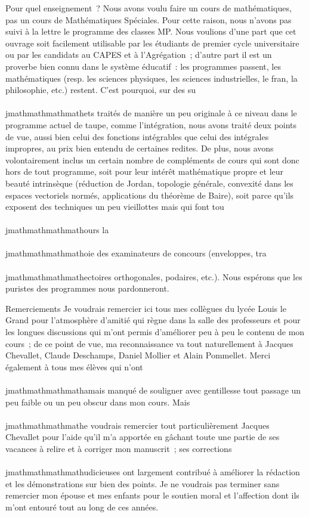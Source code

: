 Pour quel enseignement~? Nous avons voulu faire un cours de
mathématiques, pas un cours de Mathématiques Spéciales. Pour cette
raison, nous n'avons pas suivi à la lettre le programme des classes MP.
Nous voulions d'une part que cet ouvrage soit facilement utilisable par
les étudiants de premier cycle universitaire ou par les candidats au
CAPES et à l'Agrégation~; d'autre part il est un proverbe bien connu
dans le système éducatif~: les programmes passent, les mathématiques
(resp. les sciences physiques, les sciences industrielles, le
fran\ccais, la philosophie, etc.) restent. C'est
pourquoi, sur des su\\\\jmathmathmathmathets traités de manière un peu originale à ce niveau
dans le programme actuel de taupe, comme l'intégration, nous avons
traité deux points de vue, aussi bien celui des fonctions intégrables
que celui des intégrales impropres, au prix bien entendu de certaines
redites. De plus, nous avons volontairement inclus un certain nombre de
compléments de cours qui sont donc hors de tout programme, soit pour
leur intérêt mathématique propre et leur beauté intrinsèque (réduction
de Jordan, topologie générale, convexité dans les espaces vectoriels
normés, applications du théorème de Baire), soit parce qu'ils exposent
des techniques un peu vieillottes mais qui font tou\\\\jmathmathmathmathours la \\\\jmathmathmathmathoie des
examinateurs de concours (enveloppes, tra\\\\jmathmathmathmathectoires orthogonales,
podaires, etc.). Nous espérons que les puristes des programmes nous
pardonneront.

Remerciements Je voudrais remercier ici tous mes collègues du lycée
Louis le Grand pour l'atmosphère d'amitié qui règne dans la salle des
professeurs et pour les longues discussions qui m'ont permis d'améliorer
peu à peu le contenu de mon cours~; de ce point de vue, ma
reconnaissance va tout naturellement à Jacques Chevallet, Claude
Deschamps, Daniel Mollier et Alain Pommellet. Merci également à tous mes
élèves qui n'ont \\\\jmathmathmathmathamais manqué de souligner avec gentillesse tout
passage un peu faible ou un peu obscur dans mon cours. Mais \\\\jmathmathmathmathe voudrais
remercier tout particulièrement Jacques Chevallet pour l'aide qu'il m'a
apportée en gâchant toute une partie de ses vacances à relire et à
corriger mon manuscrit~; ses corrections \\\\jmathmathmathmathudicieuses ont largement
contribué à améliorer la rédaction et les démonstrations sur bien des
points. Je ne voudrais pas terminer sans remercier mon épouse et mes
enfants pour le soutien moral et l'affection dont ils m'ont entouré tout
au long de ces années.

